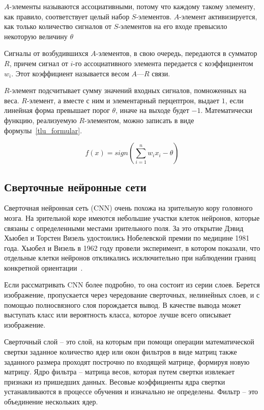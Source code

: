 $A$-элементы называются ассоциативными, потому что каждому такому элементу, как правило, соответствует целый набор $S$-элементов. $A$-элемент активизируется, как только количество сигналов от $S$-элементов на его входе превысило некоторую величину $\theta$

Сигналы от возбудившихся $A$-элементов, в свою очередь, передаются в сумматор $R$, причем сигнал от $i$-го ассоциативного элемента передается с коэффициентом $w_i$. Этот коэффициент называется весом $A$—$R$ связи.

$R$-элемент подсчитывает сумму значений входных сигналов, помноженных на веса. $R$-элемент, а вместе с ним и элементарный перцептрон, выдает $1$, если линейная форма превышает порог $\theta$, иначе на выходе будет $-1$. Математически функцию, реализуемую $R$-элементом, можно записать в виде формулы~\ref{tlu_formular}.

\begin{equation}
    \label{tlu_formular}
    f(x) = sign(\sum_{i=1}^nw_ix_i-\theta)
\end{equation}

\subsection{Сверточные нейронные сети}

Сверточная нейронная сеть (CNN) очень похожа на зрительную кору головного мозга. На зрительной коре имеются небольшие участки клеток нейронов, которые связаны с определенными местами зрительного поля. За это открытие Дэвид Хьюбел и Торстен Визель удостоились Нобелевской премии по медицине 1981 года. Хьюбел и Визель в 1962 году провели эксперимент, в котором показали, что отдельные клетки нейронов откликались исключительно при наблюдении границ конкретной ориентации~\cite{cnn}.

Если рассматривать CNN более подробно, то она состоит из серии слоев. Берется изображение, пропускается через чередование сверточных, нелинейных слоев, и с помощью полносвязного слоя порождается вывод. В качестве вывода может выступать класс или вероятность класса, которое лучше всего описывает изображение. 

Сверточный слой – это слой, на которым при помощи операции математической свертки заданное количество ядер или окон фильтров в виде матриц также заданного размера проходят построчно по входящей матрице, формируя новую матрицу. Ядро фильтра – матрица весов, которая путем свертки извлекает признаки из пришедших данных. Весовые коэффициенты ядра свертки устанавливаются в процессе обучения и изначально не определены. Фильтр – это объединение нескольких ядер.


